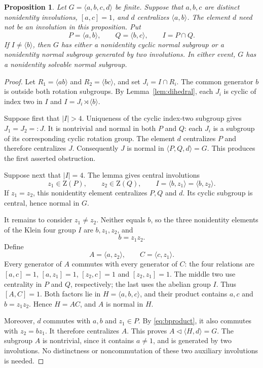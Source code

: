 \documentclass[11pt]{article}
\newtheorem{proposition}[theorem]{Proposition}
\theoremstyle{definition}\newtheorem{definition}[theorem]{Definition}
\newcommand{\gen}[1]{\langle #1\rangle}
\newcommand{\Z}{\mathrm Z}
\begin{document}
\begin{proposition}\label{prop:obstruction}
Let $G=\gen{a,b,c,d}$ be finite.  Suppose that $a,b,c$ are distinct
nonidentity involutions, $[a,c]=1$, and $d$ centralizes $\gen{a,b}$.
The element $d$ need not be an involution in this proposition.  Put
\[
 P=\gen{a,b},\qquad Q=\gen{b,c},\qquad I=P\cap Q.
\]
If $I\ne\gen b$, then $G$ has either a nonidentity cyclic normal
subgroup or a nonidentity normal subgroup generated by two involutions.
In either event, $G$ has a nonidentity solvable normal subgroup.
\end{proposition}
\begin{proof}
Let $R_1=\gen{ab}$ and $R_2=\gen{bc}$, and set $J_i=I\cap R_i$.
The common generator $b$ is outside both rotation subgroups.  By
Lemma~\ref{lem:dihedral}, each $J_i$ is cyclic of index two in $I$ and
$I=J_i\rtimes\gen b$.

Suppose first that $|I|>4$.  Uniqueness of the cyclic index-two subgroup
gives $J_1=J_2=:J$.  It is nontrivial and normal in both $P$ and $Q$:
each $J_i$ is a subgroup of its corresponding cyclic rotation group.
The element $d$ centralizes $P$ and therefore centralizes $J$.
Consequently $J$ is normal in $\gen{P,Q,d}=G$.  This produces the first
asserted obstruction.

Suppose next that $|I|=4$.  The lemma gives central involutions
\[
                z_1\in\Z(P),\qquad z_2\in\Z(Q),
                \qquad I=\gen{b,z_1}=\gen{b,z_2}.
\]
If $z_1=z_2$, this nonidentity element centralizes $P,Q$ and $d$.
Its cyclic subgroup is central, hence normal in $G$.

It remains to consider $z_1\ne z_2$.  Neither equals $b$, so the three
nonidentity elements of the Klein four group $I$ are $b,z_1,z_2$, and
\begin{equation}\label{eq:bproduct}
                              b=z_1z_2.
\end{equation}
Define
\[
                   A=\gen{a,z_2},\qquad C=\gen{c,z_1}.
\]
Every generator of $A$ commutes with every generator of $C$: the four
relations are $[a,c]=1$, $[a,z_1]=1$, $[z_2,c]=1$ and
$[z_2,z_1]=1$.  The middle two use centrality in $P$ and $Q$, respectively;
the last uses the abelian group $I$.  Thus $[A,C]=1$.
Both factors lie in $H=\gen{a,b,c}$, and their product contains $a,c$
and $b=z_1z_2$.  Hence $H=AC$, and $A$ is normal in $H$.

Moreover, $d$ commutes with $a,b$ and $z_1\in P$.  By
\eqref{eq:bproduct}, it also commutes with $z_2=bz_1$.  It therefore
centralizes $A$.  This proves $A\lhd\gen{H,d}=G$.  The subgroup $A$
is nontrivial, since it contains $a\ne1$, and is generated by two
involutions.  No distinctness or noncommutation of these two auxiliary
involutions is needed.


\end{proof}
\end{document}
